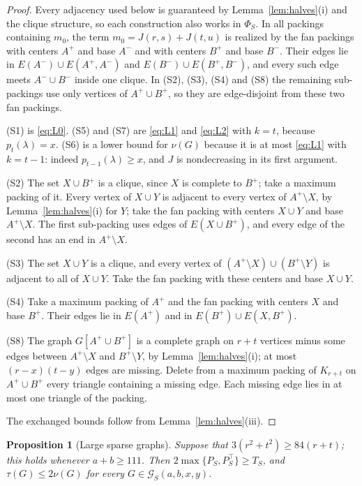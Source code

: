 \documentclass{amsart}
\newtheorem{proposition}[theorem]{Proposition}
\theoremstyle{definition}
\numberwithin{equation}{section}
\numberwithin{table}{section}
\begin{document}
\begin{proof}
Every adjacency used below is guaranteed by Lemma~\ref{lem:halves}(i) and the clique structure, so each construction also works in $\Phi_S$. In all packings containing $m_0$, the term $m_0=J(r,s)+J(t,u)$ is realized by the fan packings with centers $A^+$ and base $A^-$ and with centers $B^+$ and base $B^-$. Their edges lie in $E(A^-)\cup E(A^+,A^-)$ and $E(B^-)\cup E(B^+,B^-)$, and every such edge meets $A^-\cup B^-$ inside one clique. In (S2), (S3), (S4) and (S8) the remaining sub-packings use only vertices of $A^+\cup B^+$, so they are edge-disjoint from these two fan packings.

(S1) is \eqref{eq:L0}. (S5) and (S7) are \eqref{eq:L1} and \eqref{eq:L2} with $k=t$, because $p_t(\lambda)=x$. (S6) is a lower bound for $\nu(G)$ because it is at most \eqref{eq:L1} with $k=t-1$: indeed $p_{t-1}(\lambda)\ge x$, and $J$ is nondecreasing in its first argument.

(S2) The set $X\cup B^+$ is a clique, since $X$ is complete to $B^+$; take a maximum packing of it. Every vertex of $X\cup Y$ is adjacent to every vertex of $A^+\setminus X$, by Lemma~\ref{lem:halves}(i) for $Y$; take the fan packing with centers $X\cup Y$ and base $A^+\setminus X$. The first sub-packing uses edges of $E(X\cup B^+)$, and every edge of the second has an end in $A^+\setminus X$.

(S3) The set $X\cup Y$ is a clique, and every vertex of $(A^+\setminus X)\cup(B^+\setminus Y)$ is adjacent to all of $X\cup Y$. Take the fan packing with these centers and base $X\cup Y$.

(S4) Take a maximum packing of $A^+$ and the fan packing with centers $X$ and base $B^+$. Their edges lie in $E(A^+)$ and in $E(B^+)\cup E(X,B^+)$.

(S8) The graph $G[A^+\cup B^+]$ is a complete graph on $r+t$ vertices minus some edges between $A^+\setminus X$ and $B^+\setminus Y$, by Lemma~\ref{lem:halves}(i); at most $(r-x)(t-y)$ edges are missing. Delete from a maximum packing of $K_{r+t}$ on $A^+\cup B^+$ every triangle containing a missing edge. Each missing edge lies in at most one triangle of the packing.

The exchanged bounds follow from Lemma~\ref{lem:halves}(iii).
\end{proof}

\begin{proposition}[Large sparse graphs]\label{prop:sparse-large}
Suppose that $3(r^2+t^2)\ge 84(r+t)$; this holds whenever $a+b\ge 111$. Then $2\max\{P_S,P_S^{\top}\}\ge T_S$, and $\tau(G)\le 2\nu(G)$ for every $G\in\mathcal G_S(a,b,x,y)$.
\end{proposition}
\end{document}

